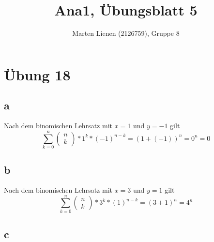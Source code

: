 \documentclass[a4paper,10pt]{article}
\title{Ana1, Übungsblatt 5}
\author{Marten Lienen (2126759), Gruppe 8}
\begin{document}
\maketitle

\section*{Übung 18}

\subsection*{a}

Nach dem binomischen Lehrsatz mit $x = 1$ und $y = -1$ gilt
\begin{equation}
 \sum_{k = 0}^n \begin{pmatrix}n\\k\end{pmatrix} * 1^k * (-1)^{n - k} = (1 + (-1))^n = 0^n = 0
\end{equation}

\subsection*{b}

Nach dem binomischen Lehrsatz mit $x = 3$ und $y = 1$ gilt
\begin{equation}
 \sum_{k = 0}^n \begin{pmatrix}n\\k\end{pmatrix} * 3^k * (1)^{n - k} = (3 + 1)^n = 4^n
\end{equation}

\subsection*{c}
\end{document}
